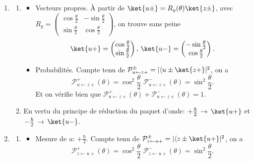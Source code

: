 \begin{enumerate}
\item
\begin{enumerate}
 \item 

\begin{itemize}
 \item Vecteurs propres. À partir de $\ket{u\pm}=R_y(\theta)\ket{z\pm}$, avec 
$R_y=\begin{pmatrix}\cos\frac{\theta}{2} & -\sin\frac{\theta}{2}\\
                   \sin\frac{\theta}{2} & \cos\frac{\theta}{2}\end{pmatrix}$, 
on trouve sans peine
              \begin{equation}
               \ket{u+}=\begin{pmatrix}
                         \cos\frac{\theta}{2}\\\sin\frac{\theta}{2}
                        \end{pmatrix},\,
               \ket{u-}=\begin{pmatrix}
                         -\sin\frac{\theta}{2}\\\cos\frac{\theta}{2}
                        \end{pmatrix}.
              \end{equation}

\item Probabilités. Compte tenu de 
$\mathcal{P}^{\pm}_{u\leftarrow z+} 
=|\langle u\pm\ket{z+}|^2$, on a
\begin{equation}
\mathcal{P}^{+}_{u\leftarrow z+}(\theta)=\cos^2\frac{\theta}{2}\,\,\mathcal{P}^ 
{-}_{u\leftarrow z+}(\theta)=\sin^2\frac{\theta}{2}.
     \end{equation}
Et on vérifie bien que $\mathcal{P}^{+}_{u\leftarrow z+}(\theta) 
+\mathcal{P}^{-}_{u\leftarrow z+}(\theta)=1$.
       \end{itemize}

\item En vertu du principe de réduction du paquet d'onde:
$+\frac{\hbar}{2}\,\rightarrow\,\ket{u+}$ et
$-\frac{\hbar}{2}\,\rightarrow\,\ket{u-}$.
\end{enumerate}

\item
\begin{enumerate}
 \item \begin{itemize}
        \item Mesure de $u$: $+\frac{\hbar}{2}$. Compte tenu de 
$\mathcal{P}^{\pm}_{z\leftarrow u+} =|\langle z\pm\ket{u+}|^2$, on a
\begin{equation}
\mathcal{P}^{+}_{z\leftarrow u+}(\theta)=\cos^2\frac{\theta}{2}\,\,\mathcal 
{P}^{-}_{z\leftarrow u+}(\theta)=\sin^2\frac{\theta}{2}.
     \end{equation}


\end{itemize}
\end{enumerate}
\end{enumerate}
